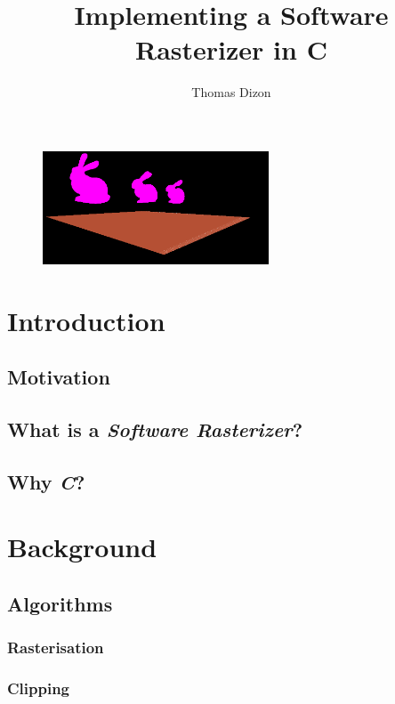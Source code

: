\documentclass{article}
\author{Thomas Dizon}
\title{Implementing a Software Rasterizer in C}
\begin{document}
\maketitle

\begin{figure}[h]
	\centering
	\includegraphics[width=0.6\textwidth]{scene.png}
	\caption{}
\end{figure}

\newpage

\tableofcontents

\newpage

\section{Introduction}

\subsection{Motivation}

\subsection{What is a \textit{Software Rasterizer}?}

\subsection{Why \textit{C}?}


\section{Background}

\subsection{Algorithms}
\subsubsection{Rasterisation}
\subsubsection{Clipping}
\end{document}
